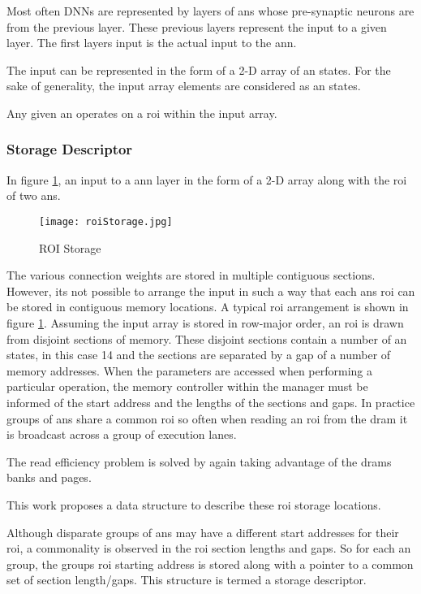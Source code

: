 Most often DNNs are represented by layers of \acp{an} whose pre-synaptic neurons are from the previous layer. These previous layers represent the input to a given layer. The first layers input is the actual input to the \ac{ann}.

The input can be represented in the form of a 2-D array of \ac{an} states. For the sake of generality, the input array elements are considered as \ac{an} states.

Any given \ac{an} operates on a \ac{roi} within the input array.

\subsubsection{Storage Descriptor}
\label{sec:Storage Descriptor}

In figure \ref{fig:roiStorage}, an input to a \ac{ann} layer in the form of a 2-D array along with the \ac{roi} of two \acp{an}.

\begin{figure}[!t]
\centering
\captionsetup{justification=centering}
\captionsetup{width=.9\linewidth}
\centerline{
\mbox{\texttt{[image: roiStorage.jpg]}}
}
\caption{ROI Storage}
\label{fig:roiStorage}
\end{figure}

The various connection weights are stored in multiple contiguous sections. However, its not possible to arrange the input in such a way that each \acp{an} \ac{roi} can be stored in contiguous memory locations. 
A typical \ac{roi} arrangement is shown in figure \ref{fig:roiStorage}. Assuming the input array is stored in row-major order, an \ac{roi} is drawn from disjoint sections of memory. 
These disjoint sections contain a number of \ac{an} states, in this case 14 and the sections are separated by a gap of a number of memory addresses. 
When the parameters are accessed when performing a particular operation, the memory controller within the manager must be informed of the start address and the lengths of the sections and gaps. 
In practice groups of \acp{an} share a common \ac{roi} so often when reading an \ac{roi} from the \ac{dram} it is broadcast across a group of execution lanes.

The read efficiency problem is solved by again taking advantage of the \ac{dram}s banks and pages.

This work proposes a data structure to describe these \ac{roi} storage locations.

Although disparate groups of \acp{an} may have a different start addresses for their \ac{roi}, a commonality is observed in the \ac{roi} section lengths and gaps. So for each \ac{an} group, the groups \ac{roi} starting address is stored along with a pointer to a common set of section length/gaps. This structure is termed a storage descriptor.

